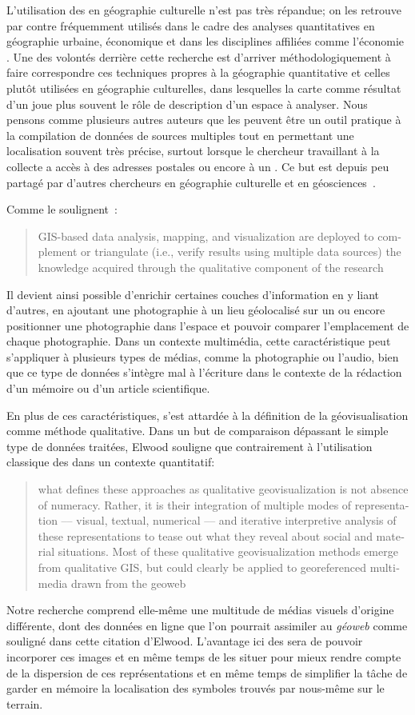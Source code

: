 L'utilisation des \sig{} en géographie culturelle n'est pas très répandue; on les retrouve par contre fréquemment utilisés dans le cadre des analyses quantitatives en géographie urbaine, économique et dans les disciplines affiliées comme l'économie \missref{}.
Une des volontés derrière cette recherche est d'arriver méthodologiquement à faire correspondre ces techniques propres à la géographie quantitative et celles plutôt utilisées en géographie culturelles, dans lesquelles la carte comme résultat d'un \sig{} joue plus souvent le rôle de description d'un espace à analyser.
Nous pensons comme plusieurs autres auteurs \citep[4]{Elwood2009} que les \sig{} peuvent être un outil pratique à la compilation de données de sources multiples tout en permettant une localisation souvent très précise, surtout lorsque le chercheur travaillant à la collecte a accès à des adresses postales ou encore à un \gps.
Ce but est depuis peu partagé par d'autres chercheurs en géographie culturelle et en géosciences~\citep{Perkins2003,Elwood2011,Elwood2009,Kwan2008,Madden2009,Knigge2006,Jung2010}.

Comme le soulignent~\cite{Kwan2008}: \foreignblockquote{english}[{\citeyear[444]{Kwan2008}}][]{GIS-based data analysis, mapping, and visualization are deployed to complement or triangulate (i.e., verify results using multiple data sources) the knowledge acquired through the qualitative component of the research}.
Il devient ainsi possible d'enrichir certaines couches d'information en y liant d'autres, en ajoutant une photographie à un lieu géolocalisé sur un \sig{} ou encore positionner une photographie dans l'espace et pouvoir comparer l'emplacement de chaque photographie.
Dans un contexte multimédia, cette caractéristique peut s'appliquer à plusieurs types de médias, comme la photographie ou l'audio, bien que ce type de données s'intègre mal à l'écriture dans le contexte de la rédaction d'un mémoire ou d'un article scientifique.

En plus de ces caractéristiques, \citet{Elwood2011} s'est attardée à la définition de la géovisualisation comme méthode qualitative.
Dans un but de comparaison dépassant le simple type de données traitées, Elwood souligne que contrairement à l'utilisation classique des \sig{} dans un contexte quantitatif: \foreignblockquote{english}[{\cite{Elwood2011}}][.]{\textelp{} what defines these approaches as qualitative geovisualization is not absence of numeracy.
 Rather, it is their integration of multiple modes of representation –-- visual, textual, numerical --– and iterative interpretive analysis of these representations to tease out what they reveal about social and material situations.
Most of these qualitative geovisualization methods emerge from qualitative GIS, but could clearly be applied to georeferenced multimedia drawn from the geoweb}.
Notre recherche comprend elle-même une multitude de médias visuels d'origine différente, dont des données en ligne que l'on pourrait assimiler au \emph{géoweb} comme souligné dans cette citation d'Elwood.
L'avantage ici des \sig{} sera de pouvoir incorporer ces images et en même temps de les situer pour mieux rendre compte de la dispersion de ces représentations et en même temps de simplifier la tâche de garder en mémoire la localisation des symboles trouvés par nous-même sur le terrain.

